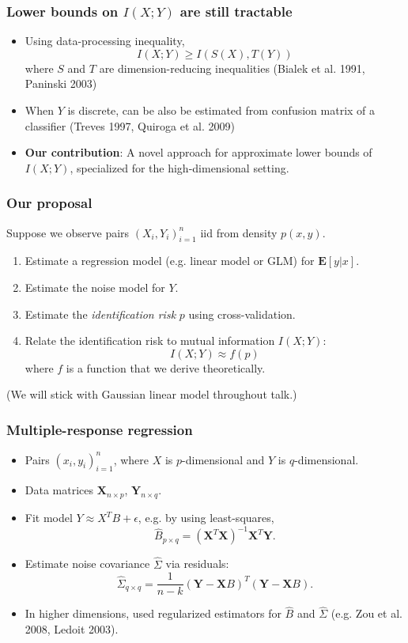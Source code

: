 \documentclass{beamer}
\newcommand{\E}{\textbf{E}}
\newcommand{\bX}{\boldsymbol{X}}
\newcommand{\bY}{\boldsymbol{Y}}
\begin{document}
\begin{frame}
\frametitle{Lower bounds on $I(X; Y)$ are still tractable}
\begin{itemize}
\item Using data-processing inequality,
\[
I(X; Y) \geq I(S(X), T(Y))
\]
where $S$ and $T$ are dimension-reducing inequalities (Bialek et al. 1991, Paninski 2003)
\item When $Y$ is discrete, can be also be estimated from confusion matrix of a classifier (Treves 1997, Quiroga et al. 2009)
\item \textbf{Our contribution}: A novel approach for approximate lower bounds of $I(X; Y)$, specialized for the high-dimensional setting.
\end{itemize}
\end{frame}

\begin{frame}
\frametitle{Our proposal}
Suppose we observe pairs $(X_i,Y_i)_{i=1}^n$ iid from density $p(x, y)$.
\begin{enumerate}
\item Estimate a regression model (e.g. linear model or GLM) for $\E[y|x]$.
\item Estimate the noise model for $Y$.
\item Estimate the \emph{identification risk} $p$ using cross-validation.
\item Relate the identification risk to mutual information $I(X; Y)$:
\[
I(X; Y) \approx f(p)
\]
where $f$ is a function that we derive theoretically. 
\end{enumerate}
(We will stick with Gaussian linear model throughout talk.)
\end{frame}

\begin{frame}
\frametitle{Multiple-response regression}
\begin{itemize}
\item Pairs $(x_i,y_i)_{i=1}^n$, where $X$ is $p$-dimensional and $Y$ is $q$-dimensional.
\item Data matrices $\bX_{n \times p}$, $\bY_{n \times q}$.
\item Fit model $Y \approx X^T B  + \epsilon$, e.g. by using least-squares,
\[
\hat{B}_{p \times q} = (\bX^T \bX)^{-1} \bX^T \bY.
\]
\item Estimate noise covariance $\hat{\Sigma}$ via residuals:
\[
\hat{\Sigma}_{q \times q} = \frac{1}{n-k} (\bY - \bX B)^T(\bY - \bX B).
\]
\item In higher dimensions, used regularized estimators for $\hat{B}$ and $\hat{\Sigma}$ (e.g. Zou et al. 2008, Ledoit 2003).
\end{itemize}
\end{frame}
\end{document}
